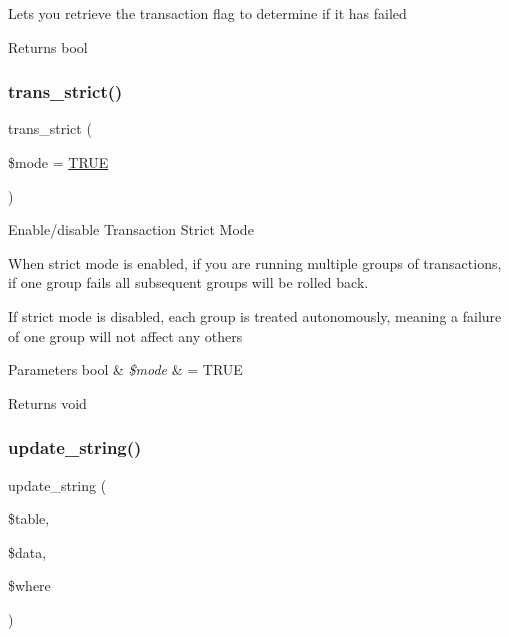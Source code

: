 Lets you retrieve the transaction flag to determine if it has failed

\begin{DoxyReturn}{Returns}
bool 
\end{DoxyReturn}
\mbox{\label{class_c_i___d_b__driver_a648f8e6b3d0c53ce2afd63cfcea1fe74}} 
\subsubsection{\texorpdfstring{trans\+\_\+strict()}{trans\_strict()}}
{\footnotesize\ttfamily trans\+\_\+strict (\begin{DoxyParamCaption}\item[{}]{\$mode = {\ttfamily \mbox{\hyperlink{constants_8php_ae04a3efe6aa42044f803ee90c2277846}{T\+R\+UE}}} }\end{DoxyParamCaption})}

Enable/disable Transaction Strict Mode

When strict mode is enabled, if you are running multiple groups of transactions, if one group fails all subsequent groups will be rolled back.

If strict mode is disabled, each group is treated autonomously, meaning a failure of one group will not affect any others


\begin{DoxyParams}[1]{Parameters}
bool & {\em \$mode} & = T\+R\+UE \\
\hline
\end{DoxyParams}
\begin{DoxyReturn}{Returns}
void 
\end{DoxyReturn}
\mbox{\label{class_c_i___d_b__driver_af9eb76a74d10fa81e44ecb0dd9bf00d4}} 
\subsubsection{\texorpdfstring{update\+\_\+string()}{update\_string()}}
{\footnotesize\ttfamily update\+\_\+string (\begin{DoxyParamCaption}\item[{}]{\$table,  }\item[{}]{\$data,  }\item[{}]{\$where }\end{DoxyParamCaption})}

